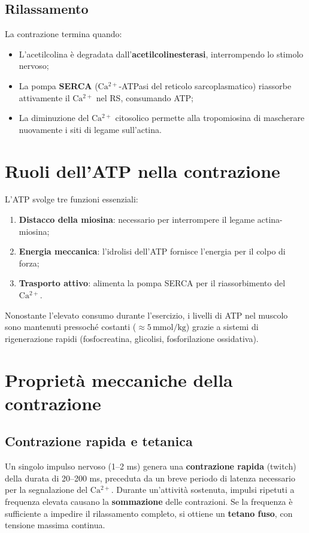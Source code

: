 \documentclass[12pt,a4paper]{report}
\begin{document}
\subsection{Rilassamento}
La contrazione termina quando:
\begin{itemize}
\item L'acetilcolina è degradata dall'\textbf{acetilcolinesterasi}, interrompendo lo stimolo nervoso;
\item La pompa \textbf{SERCA} (\(\mathrm{Ca^{2+}}\)-ATPasi del reticolo sarcoplasmatico) riassorbe attivamente il \(\mathrm{Ca^{2+}}\) nel RS, consumando ATP;
\item La diminuzione del \(\mathrm{Ca^{2+}}\) citosolico permette alla tropomiosina di mascherare nuovamente i siti di legame sull'actina.
\end{itemize}

\section{Ruoli dell'ATP nella contrazione}
L'ATP svolge tre funzioni essenziali:
\begin{enumerate}
\item \textbf{Distacco della miosina}: necessario per interrompere il legame actina-miosina;
\item \textbf{Energia meccanica}: l'idrolisi dell'ATP fornisce l'energia per il colpo di forza;
\item \textbf{Trasporto attivo}: alimenta la pompa SERCA per il riassorbimento del \(\mathrm{Ca^{2+}}\).
\end{enumerate}
Nonostante l'elevato consumo durante l'esercizio, i livelli di ATP nel muscolo sono mantenuti pressoché costanti (\(\approx 5\,\mathrm{mmol/kg}\)) grazie a sistemi di rigenerazione rapidi (fosfocreatina, glicolisi, fosforilazione ossidativa).

\section{Proprietà meccaniche della contrazione}
\subsection{Contrazione rapida e tetanica}
Un singolo impulso nervoso (1--2 ms) genera una \textbf{contrazione rapida} (twitch) della durata di 20--200 ms, preceduta da un breve periodo di latenza necessario per la segnalazione del \(\mathrm{Ca^{2+}}\).
Durante un'attività sostenuta, impulsi ripetuti a frequenza elevata causano la \textbf{sommazione} delle contrazioni. Se la frequenza è sufficiente a impedire il rilassamento completo, si ottiene un \textbf{tetano fuso}, con tensione massima continua.
\end{document}

